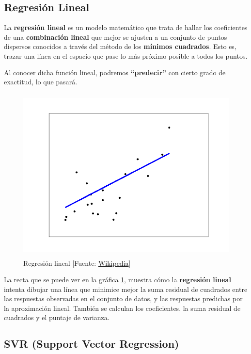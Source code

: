 	\subsection{Regresión Lineal}
	\label{makereference4.3.1}

	La \textbf{regresión lineal} es un modelo matemático que trata de hallar los coeficientes de una \textbf{combinación lineal} que mejor se ajusten a un conjunto de puntos dispersos conocidos a través del método de los \textbf{mínimos cuadrados}. Esto es, trazar una línea en el espacio que pase lo más próximo posible a todos los puntos.

	Al conocer dicha función lineal, podremos \textbf{``predecir''} con cierto grado de exactitud, lo que pasará.

	\begin{figure}[htb]
		\begin{center}
			\includegraphics[height=3.5in]{figures/regression.png}
			\caption{Regresión lineal [Fuente: \href{www.wikipedia.org}{Wikipedia}]}
		\end{center}
		\label{regression}
	\end{figure}
	
	La recta que se puede ver en la gráfica \ref{regression}, muestra cómo la \textbf{regresión lineal} intenta dibujar una línea que minimice mejor la suma residual de cuadrados entre las respuestas observadas en el conjunto de datos, y las respuestas predichas por la aproximación lineal.
	También se calculan los coeficientes, la suma residual de cuadrados y el puntaje de varianza.

	\subsection{SVR (Support Vector Regression)}
	\label{makereference4.3.2}

